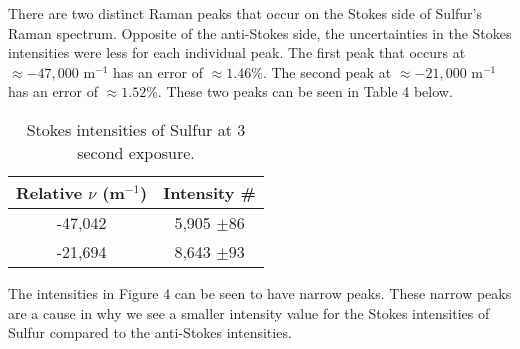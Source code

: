 \documentclass[twocolumn]{article}
\begin{document}
\newline
There are two distinct Raman peaks that occur on the Stokes side of Sulfur's Raman spectrum. Opposite of the anti-Stokes side, the uncertainties in the Stokes intensities were less for each individual peak. The first peak that occurs at $\approx -47,000$ m$^{-1}$ has an error of $\approx 1.46\%$. The second peak at $\approx -21,000$ m$^{-1}$ has an error of $\approx 1.52\%$. These two peaks can be seen in Table 4 below.
\begin{table}[htp]
\begin{center}
\begin{tabular}{|c|c|}
    \hline \textbf{Relative $\nu$ (m$^{-1}$)} & \textbf{Intensity \#} \\ \hline
    -47,042 & 5,905 $\pm 86$ \\ \hline
    -21,694 & 8,643 $\pm 93$ \\ \hline
\end{tabular}
\caption{Stokes intensities of Sulfur at 3 second exposure.}
\end{center}
\label{default}
\end{table}%
\newline
The intensities in Figure 4 can be seen to have narrow peaks. These narrow peaks are a cause in why we see a smaller intensity value for the Stokes intensities of Sulfur compared to the anti-Stokes intensities.
\end{document}
